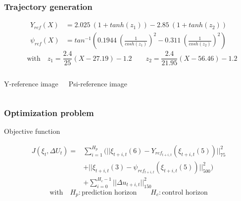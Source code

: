 \documentclass{beamer}
\begin{document}
\begin{frame}
\frametitle{Trajectory generation}

\begin{align*}
Y_{ref}(X) &= 2.025 \ (1 + tanh(z_1)) - 2.85 \ (1 + tanh(z_2)) \\
\psi_{ref}(X) &= tan^{-1} \left( 0.1944 \ \left(\frac{1}{cosh(z_1)}\right)^2 - 0.311 \ \left(\frac{1}{cosh(z_2)}\right)^2 \right)
\end{align*}
\[\quad \text{with} \quad z_1 = \frac{2.4}{25}(X - 27.19) - 1.2 \qquad z_2 =
\frac{2.4}{21.95}(X - 56.46) - 1.2 \]


\begin{columns}[t,onlytextwidth]
Y-reference image

Psi-reference image

\end{columns}

\end{frame}






\begin{frame}
\frametitle{Optimization problem}

\begin{block}{Objective function}


\begin{align*}
J(\xi_{t}, \Delta U_t) = &\sum_{i=1}^{H_p} ( ||\xi_{t+i,t}(6) -
Y_{ref_{t+i,t}}(\xi_{t+i,t}(5)) ||_{75}^2 \\ 
&+ ||\xi_{t+i,t}(3) -
\psi_{ref_{t+i,t}}(\xi_{t+i,t}(5)) ||_{500}^2 ) \\
&+ \sum_{i=0}^{H_c-1} || \Delta u_{t+i,t} ||_{150}^2
\end{align*}
\[\text{with} \quad H_p : \text{prediction horizon} \qquad H_c : \text{control
horizon}\]


\end{block}

\end{frame}
\end{document}
